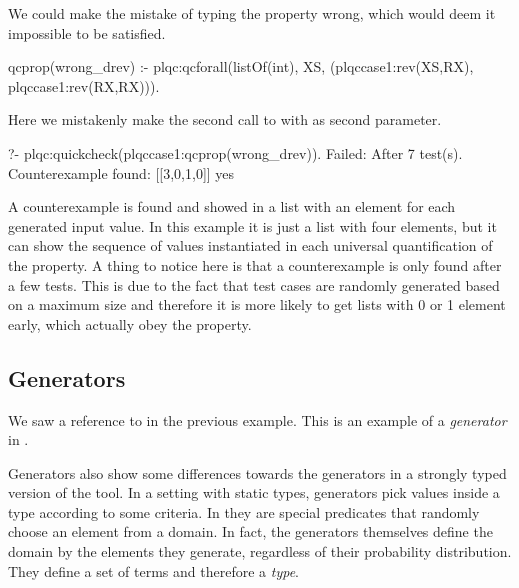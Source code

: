 We could make the mistake of typing the property wrong, which would deem
it impossible to be satisfied.
%
\begin{yapcode}
 qcprop(wrong_drev) :-
   plqc:qcforall(listOf(int), XS,
                 (plqccase1:rev(XS,RX),
                  plqccase1:rev(RX,RX))).
\end{yapcode}
%
Here we mistakenly make the second call to  with  as
second parameter.
%
\begin{yapcode}
   ?- plqc:quickcheck(plqccase1:qcprop(wrong_drev)).
 Failed: After 7 test(s).
 Counterexample found: [[3,0,1,0]] 
 yes
\end{yapcode}
A counterexample is found and showed in a list with an element for each
generated input value.
%
In this example it is just a list with four elements, but it can show
the sequence of values instantiated in each universal quantification of
the property.
%
A thing to notice here is that a counterexample is only found after a
few tests.
%
This is due to the fact that test cases are randomly generated based on
a maximum size and therefore it is more likely to get lists with 0 or 1
element early, which actually obey the property.


\subsection{Generators}
We saw a reference to  in the previous example.
%
This is an example of a \emph{generator} in \plqc{}.



Generators also show some differences towards the generators in a
strongly typed version of the tool.
%
In a setting with static types, generators pick values inside a type
according to some criteria.
%
In \plqc{} they are special predicates that randomly choose an element
from a domain.
%
In fact, the generators themselves define the domain by the elements
they generate, regardless of their probability distribution.
%
They define a set of terms and therefore a \emph{type}.




\begin{yapcode}
\end{yapcode}


